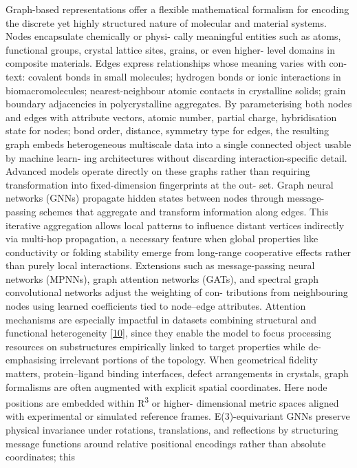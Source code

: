 \documentclass[
]{article}
\begin{document}
Graph-based representations offer a flexible mathematical formalism for
encoding the discrete yet highly structured nature of molecular and
material systems. Nodes encapsulate chemically or physi- cally
meaningful entities such as atoms, functional groups, crystal lattice
sites, grains, or even higher- level domains in composite materials.
Edges express relationships whose meaning varies with con- text:
covalent bonds in small molecules; hydrogen bonds or ionic interactions
in biomacromolecules; nearest-neighbour atomic contacts in crystalline
solids; grain boundary adjacencies in polycrystalline aggregates. By
parameterising both nodes and edges with attribute vectors, atomic
number, partial charge, hybridisation state for nodes; bond order,
distance, symmetry type for edges, the resulting graph embeds
heterogeneous multiscale data into a single connected object usable by
machine learn- ing architectures without discarding interaction-specific
detail. Advanced models operate directly on these graphs rather than
requiring transformation into fixed-dimension fingerprints at the out-
set. Graph neural networks (GNNs) propagate hidden states between nodes
through message-passing schemes that aggregate and transform information
along edges. This iterative aggregation allows local patterns to
influence distant vertices indirectly via multi-hop propagation, a
necessary feature when global properties like conductivity or folding
stability emerge from long-range cooperative effects rather than purely
local interactions. Extensions such as message-passing neural networks
(MPNNs), graph attention networks (GATs), and spectral graph
convolutional networks adjust the weighting of con- tributions from
neighbouring nodes using learned coefficients tied to node--edge
attributes. Attention mechanisms are especially impactful in datasets
combining structural and functional heterogeneity
{[}\protect\hyperlink{_bookmark50}{10}{]}, since they enable the model
to focus processing resources on substructures empirically linked to
target properties while de-emphasising irrelevant portions of the
topology. When geometrical fidelity matters, protein--ligand binding
interfaces, defect arrangements in crystals, graph formalisms are often
augmented with explicit spatial coordinates. Here node positions are
embedded within R\textsuperscript{3} or higher- dimensional metric
spaces aligned with experimental or simulated reference frames.
E(3)-equivariant GNNs preserve physical invariance under rotations,
translations, and reflections by structuring message functions around
relative positional encodings rather than absolute coordinates; this
\end{document}
